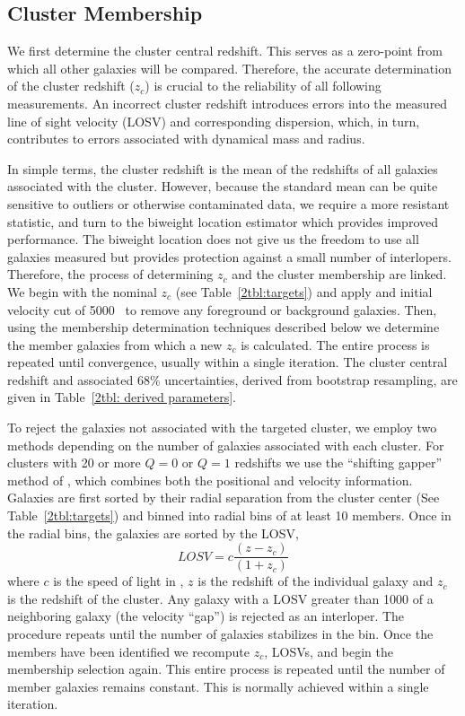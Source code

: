 \subsection{Cluster Membership}\label{2sec:cluster membership} 
We first determine the cluster central redshift. This serves as a zero-point from which all other galaxies will be compared. Therefore, the accurate determination of the cluster redshift ($z_c$) is crucial to the reliability of all following measurements. An incorrect cluster redshift introduces errors into the measured line of sight velocity (LOSV) and corresponding dispersion, which, in turn, contributes to errors associated with dynamical mass and radius. 

In simple terms, the cluster redshift is the mean of the redshifts of all galaxies associated with the cluster. However, because the standard mean can be quite sensitive to outliers or otherwise contaminated data, we require a more resistant statistic, and turn to the biweight location estimator \citep{Beers1990} which provides improved performance. The biweight location does not give us the freedom to use all galaxies measured but provides protection against a small number of interlopers. Therefore, the process of determining $z_c$ and the cluster membership are linked. We begin with the nominal $z_c$ (see Table~\ref{2tbl:targets}) and apply and initial velocity cut of 5000 \kms\ to remove any foreground or background galaxies. Then, using the membership determination techniques described below we determine the member galaxies from which a new $z_c$ is calculated. The entire process is repeated until convergence, usually within a single iteration. The cluster central redshift and associated 68\% uncertainties, derived from bootstrap resampling, are given in Table~\ref{2tbl: derived parameters}.

To reject the galaxies not associated with the targeted cluster, we employ two methods depending on the number of galaxies associated with each cluster. For clusters with 20 or more $Q=0$ or $Q=1$ redshifts we use the ``shifting gapper'' method of , which combines both the positional and velocity information. Galaxies are first sorted by their radial separation from the cluster center (See Table~\ref{2tbl:targets}) and binned into radial bins of at least 10 members. Once in the radial bins, the galaxies are sorted by the LOSV, 
\begin{equation}
	LOSV = c\frac{(z-z_{c})}{(1+z_{c})} 
\end{equation}
where $c$ is the speed of light in \kms, $z$ is the redshift of the individual galaxy and $z_{c}$ is the redshift of the cluster. Any galaxy with a LOSV greater than 1000 \kms of a neighboring galaxy (the velocity ``gap'') is rejected as an interloper. The procedure repeats until the number of galaxies stabilizes in the bin. Once the members have been identified we recompute $z_c$, LOSVs, and begin the membership selection again. This entire process is repeated until the number of member galaxies remains constant. This is normally achieved within a single iteration. 

